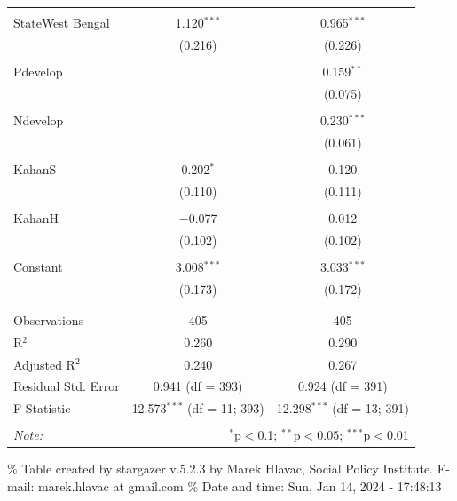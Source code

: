 \documentclass[
]{article}
\begin{document}
\begin{table}[!htbp]
\begin{tabular}{@{\extracolsep{5pt}}lcc}
  & & \\ 
 StateWest Bengal & 1.120$^{***}$ & 0.965$^{***}$ \\ 
  & (0.216) & (0.226) \\ 
  & & \\ 
 Pdevelop &  & 0.159$^{**}$ \\ 
  &  & (0.075) \\ 
  & & \\ 
 Ndevelop &  & 0.230$^{***}$ \\ 
  &  & (0.061) \\ 
  & & \\ 
 KahanS & 0.202$^{*}$ & 0.120 \\ 
  & (0.110) & (0.111) \\ 
  & & \\ 
 KahanH & $-$0.077 & 0.012 \\ 
  & (0.102) & (0.102) \\ 
  & & \\ 
 Constant & 3.008$^{***}$ & 3.033$^{***}$ \\ 
  & (0.173) & (0.172) \\ 
  & & \\ 
\hline \\[-1.8ex] 
Observations & 405 & 405 \\ 
R$^{2}$ & 0.260 & 0.290 \\ 
Adjusted R$^{2}$ & 0.240 & 0.267 \\ 
Residual Std. Error & 0.941 (df = 393) & 0.924 (df = 391) \\ 
F Statistic & 12.573$^{***}$ (df = 11; 393) & 12.298$^{***}$ (df = 13; 391) \\ 
\hline 
\hline \\[-1.8ex] 
\textit{Note:}  & \multicolumn{2}{r}{$^{*}$p$<$0.1; $^{**}$p$<$0.05; $^{***}$p$<$0.01} \\ 
\end{tabular} 
\end{table} 
\endgroup

\newpage

\begingroup\setlength{\tabcolsep}{1pt}

\renewcommand{\arraystretch}{0.7}

\% Table created by stargazer v.5.2.3 by Marek Hlavac, Social Policy
Institute. E-mail: marek.hlavac at gmail.com \% Date and time: Sun, Jan
14, 2024 - 17:48:13
\end{document}
